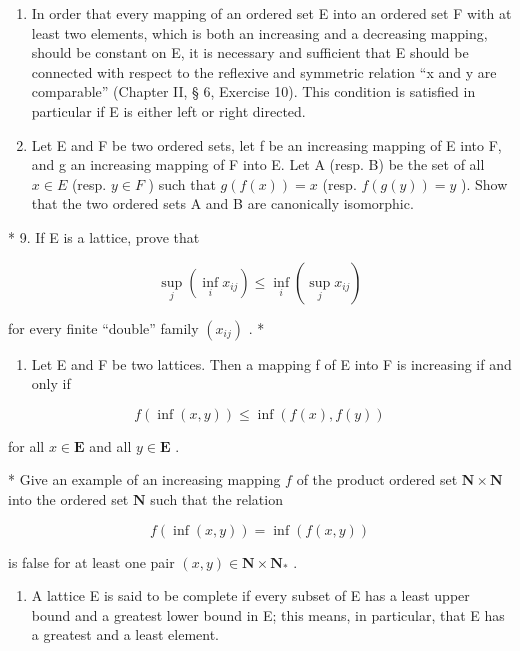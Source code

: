 \begin{enumerate}
\def\labelenumi{\arabic{enumi}.}
\setcounter{enumi}{6}
\item
  In order that every mapping of an ordered set E into an ordered set F with at least two elements, which is both an increasing and a decreasing mapping, should be constant on E, it is necessary and sufficient that E should be connected with respect to the reflexive and symmetric relation ``x and y are comparable'' (Chapter II, § 6, Exercise 10). This condition is satisfied in particular if E is either left or right directed.
\item
  Let E and F be two ordered sets, let f be an increasing mapping of E into F, and g an increasing mapping of F into E. Let A (resp. B) be the set of all \(x \in E\) (resp. \(y \in F\) ) such that \(g(f(x)) = x\) (resp. \(f(g(y)) = y\) ). Show that the two ordered sets A and B are canonically isomorphic.
\end{enumerate}

* 9. If E is a lattice, prove that

\[
\sup _ {j} \left(\inf _ {i} x _ {i j}\right) \leqslant \inf _ {i} \left(\sup _ {j} x _ {i j}\right)
\]

for every finite ``double'' family \((x_{ij})\) . *

\begin{enumerate}
\def\labelenumi{\arabic{enumi}.}
\setcounter{enumi}{9}
\tightlist
\item
  Let E and F be two lattices. Then a mapping f of E into F is increasing if and only if
\end{enumerate}

\[
f (\inf (x, y)) \leqslant \inf (f (x), f (y))
\]

for all \(x \in \mathbf{E}\) and all \(y \in \mathbf{E}\) .

* Give an example of an increasing mapping \(f\) of the product ordered set \(\mathbf{N} \times \mathbf{N}\) into the ordered set \(\mathbf{N}\) such that the relation

\[
f (\inf (x, y)) = \inf (f (x, y))
\]

is false for at least one pair \((x, y) \in \mathbf{N} \times \mathbf{N}_{*}\) .

\begin{enumerate}
\def\labelenumi{\arabic{enumi}.}
\setcounter{enumi}{10}
\tightlist
\item
  A lattice E is said to be complete if every subset of E has a least upper bound and a greatest lower bound in E; this means, in particular, that E has a greatest and a least element.
\end{enumerate}

